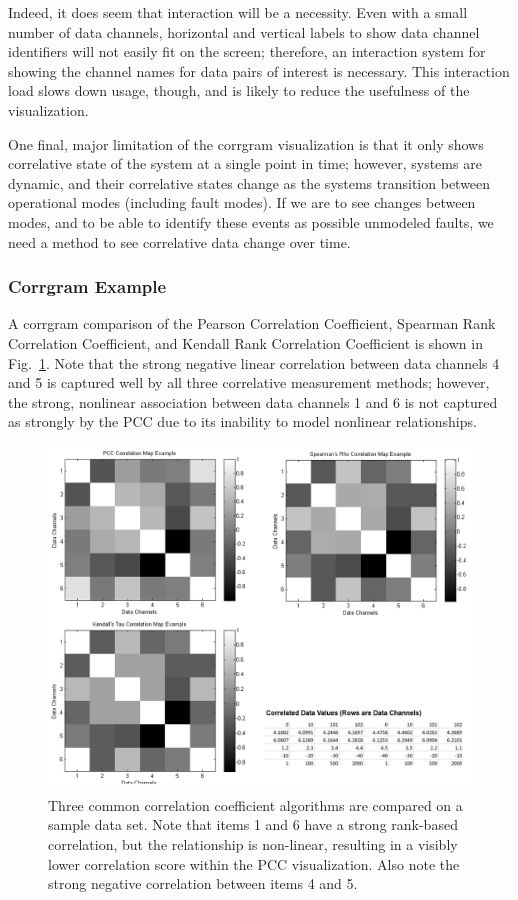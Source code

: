 Indeed, it does seem that interaction will be a necessity. Even with a small number of data channels, horizontal and vertical labels to show data channel identifiers will not easily fit on the screen; therefore, an interaction system for showing the channel names for data pairs of interest is necessary. This interaction load slows down usage, though, and is likely to reduce the usefulness of the visualization.

One final, major limitation of the corrgram visualization is that it only shows correlative state of the system at a single point in time; however, systems are dynamic, and their correlative states change as the systems transition between operational modes (including fault modes). If we are to see changes between modes, and to be able to identify these events as possible unmodeled faults, we need a method to see correlative data change over time.

\subsubsection{Corrgram Example}

A corrgram comparison of the Pearson Correlation Coefficient, Spearman Rank Correlation Coefficient, and Kendall Rank Correlation Coefficient is shown in Fig.~\ref{fig:correlation_comparison}. Note that the strong negative linear correlation between data channels 4 and 5 is captured well by all three correlative measurement methods; however, the strong, nonlinear association between data channels 1 and 6 is not captured as strongly by the PCC due to its inability to model nonlinear relationships.

\begin{figure}[h]
\centering
    \includegraphics[width=\columnwidth]{images/correlation_comparison.png}
    \caption{Three common correlation coefficient algorithms are compared on a sample data set. Note that items 1 and 6 have a strong rank-based correlation, but the relationship is non-linear, resulting in a visibly lower correlation score within the PCC visualization. Also note the strong negative correlation between items 4 and 5.}
    \label{fig:correlation_comparison}
\end{figure}

